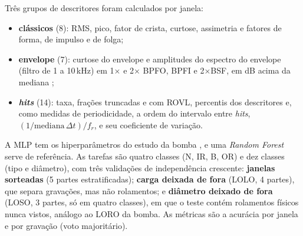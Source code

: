 Três grupos de descritores foram calculados por janela:
\begin{itemize}
	\item \textbf{clássicos} (8): RMS, pico, fator de crista, curtose, assimetria e fatores de forma, de impulso e de folga;
	\item \textbf{envelope} (7): curtose do envelope e amplitudes do espectro do envelope (filtro de 1 a 10\,kHz) em 1\(\times\) e 2\(\times\) BPFO, BPFI e 2\(\times\)BSF, em dB acima da mediana \cite{randall2011};
	\item \textbf{\textit{hits}} (14): taxa, frações truncadas e com ROVL, percentis dos descritores e, como medidas de periodicidade, a ordem do intervalo entre \textit{hits}, \((1/\mathrm{mediana}\,\Delta t)/f_r\), e seu coeficiente de variação.
\end{itemize}

A MLP tem os hiperparâmetros do estudo da bomba \cite{pedregosa2011}, e uma \textit{Random Forest} serve de referência. As tarefas são quatro classes (N, IR, B, OR) e dez classes (tipo e diâmetro), com três validações de independência crescente: \textbf{janelas sorteadas} (5 partes estratificadas); \textbf{carga deixada de fora} (LOLO, 4 partes), que separa gravações, mas não rolamentos; e \textbf{diâmetro deixado de fora} (LOSO, 3 partes, só em quatro classes), em que o teste contém rolamentos físicos nunca vistos, análogo ao LORO da bomba. As métricas são a acurácia por janela e por gravação (voto majoritário).
